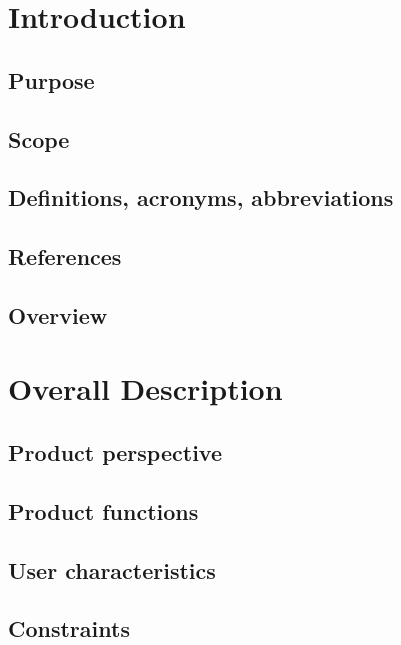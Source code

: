\documentclass{book}
\begin{document}

\tableofcontents

\chapter{Introduction} \label{c:intro}

\section{Purpose}
\section{Scope}
\section{Definitions, acronyms, abbreviations}
\section{References}
\section{Overview}

\chapter{Overall Description} \label{c:descr}
\section{Product perspective}
\section{Product functions}
\section{User characteristics}
\section{Constraints}
\end{document}
